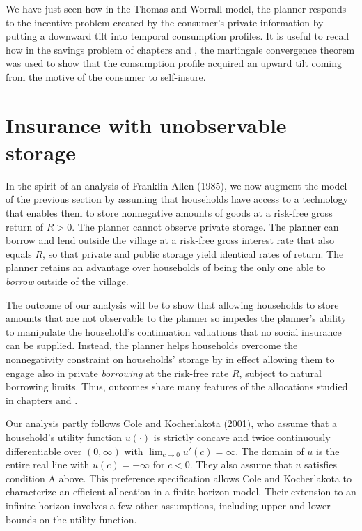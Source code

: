   We have just seen how in the Thomas and Worrall model, the planner
responds to the incentive problem created by
the consumer's private information by putting a
 downward tilt into temporal  consumption profiles.   It is
useful to recall how in the savings problem of
chapters  and , the
martingale  convergence theorem was used to show that
the consumption profile acquired an upward tilt coming
from the motive of the consumer to self-insure.


\section{Insurance with unobservable storage}
%
In the spirit of an analysis of  Franklin Allen (1985), we now augment the model of the
previous section by assuming that households have access to a
technology that enables them to store nonnegative amounts of goods
at a risk-free gross return of $R>0$. The planner cannot observe
private storage. The planner can borrow and lend outside the
village at a risk-free gross interest rate that also equals $R$, so
that private and public storage yield identical rates of return.
The planner retains an advantage over households of being the
only one able to {\it borrow\/} outside of the village.

The outcome of our analysis will be to show that allowing households
to store amounts that are not observable to the planner so impedes
the planner's ability to manipulate the household's continuation
valuations that no social insurance can be supplied.  Instead,
the planner helps households overcome the nonnegativity constraint
on  households' storage by in effect allowing them to engage also
in private {\it borrowing\/} at the risk-free rate $R$, subject to natural
borrowing limits. Thus, outcomes share many features of the allocations
studied in chapters  and .

Our analysis partly follows Cole and Kocherlakota (2001),
%
who assume that a household's utility function $u(\cdot)$ is strictly
concave and twice continuously differentiable over $(0,\infty)$
with $\lim_{c\rightarrow 0}u'(c)=\infty$. The domain of $u$
is the entire real line with $u(c)=-\infty$ for
$c<0$. They also
assume that $u$ satisfies condition A above. This preference specification
allows Cole and Kocherlakota to characterize an  efficient allocation in
a finite horizon model. Their extension to an infinite horizon
involves a few other assumptions, including upper and lower
bounds on the utility function.

